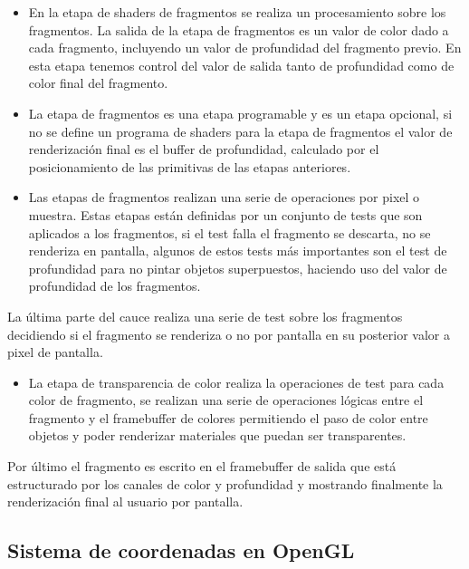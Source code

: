 \documentclass[a4paper, 17pt]{book}
\begin{document}
\begin{itemize}
  \item En la etapa de shaders de fragmentos se realiza un procesamiento sobre los fragmentos. La salida de la etapa de fragmentos es
  un valor de color dado a cada fragmento, incluyendo un valor de profundidad del fragmento previo.  En esta etapa tenemos control
  del valor de salida tanto de profundidad como de color final del fragmento. 
  
  \item La etapa de fragmentos es una etapa programable y es un etapa opcional, si no se define un programa de shaders para la etapa
  de fragmentos el valor de renderización final es el buffer de profundidad, calculado por el posicionamiento de las primitivas de
  las etapas anteriores.

  \item Las etapas de fragmentos realizan una serie de operaciones por pixel o muestra. Estas etapas están definidas por un conjunto
  de tests que son aplicados a los fragmentos, si el test falla el fragmento se descarta, no se renderiza en pantalla, algunos de
  estos tests más importantes son el test de profundidad para no pintar objetos superpuestos, haciendo uso del valor de profundidad
  de los fragmentos.
\end{itemize}

La última parte del cauce realiza una serie de test sobre los fragmentos decidiendo si el fragmento se renderiza o no por pantalla en
su posterior valor a pixel de pantalla.

\begin{itemize}
  \item  La etapa de transparencia de color realiza la operaciones de test para cada color de fragmento, se realizan una serie de
  operaciones lógicas entre el fragmento y el framebuffer de colores permitiendo el paso de color entre objetos y poder renderizar
  materiales que puedan ser transparentes.
\end{itemize}

Por último el fragmento es escrito en el framebuffer de salida que está estructurado por los canales de color y profundidad y mostrando
finalmente la renderización final al usuario por pantalla.

\subsection{Sistema de coordenadas en OpenGL} 
\label{subsec:SysOpenGL}
\end{document}
